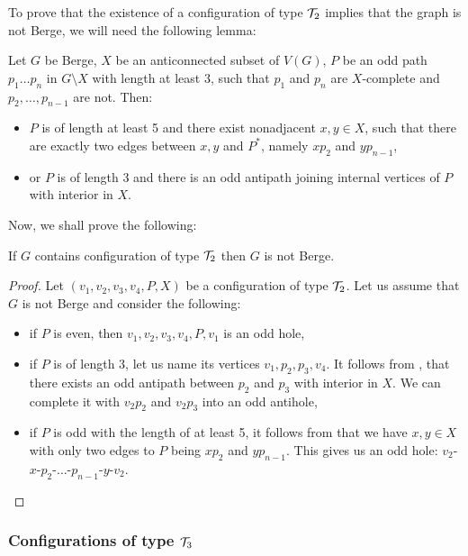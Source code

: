 To prove that the existence of a configuration of type $\mathcal{T}_2$ implies that the graph is not Berge, we will need the following lemma:

\begin{lemma}\label{lem:Roussel-Rubio}
	Let $G$ be Berge, $X$ be an anticonnected subset of $V(G)$, $P$ be an odd path $p_1\ldots p_n$ in $G\setminus X$ with length at least 3, such that $p_1$ and $p_n$ are $X$-complete and $p_2, \ldots, p_{n-1}$ are not. Then:
	\begin{itemize}
		\item $P$ is of length at least 5 and there exist nonadjacent $x, y \in X$, such that there are exactly two edges between $x, y$ and $P^*$, namely $xp_2$ and $yp_{n-1}$,
		\item or $P$ is of length 3 and there is an odd antipath joining internal vertices of $P$ with interior in $X$.
	\end{itemize}
\end{lemma}

Now, we shall prove the following:

\begin{theorem}
	If $G$ contains configuration of type $\mathcal{T}_2$ then $G$ is not Berge.
\end{theorem}
\begin{proof}
	Let $(v_1, v_2, v_3, v_4, P, X)$ be a configuration of type $\mathcal{T}_2$. Let us assume that $G$ is not Berge and consider the following:
	\begin{itemize}
		\item if $P$ is even, then $v_1, v_2, v_3, v_4, P, v_1$ is an odd hole,
		\item if $P$ is of length 3, let us name its vertices $v_1, p_2, p_3, v_4$. It follows from , that there exists an odd antipath between $p_2$ and $p_3$ with interior in $X$. We can complete it with $v_2p_2$ and $v_2p_3$ into an odd antihole,
		\item if $P$ is odd with the length of at least 5, it follows from  that we have $x, y \in X$ with only two edges to $P$ being $xp_2$ and $yp_{n-1}$. This gives us an odd hole: $v_2$-$x$-$p_2$-$\ldots$-$p_{n-1}$-$y$-$v_2$.
	\end{itemize}
\end{proof}

\subsubsection{Configurations of type $\mathcal{T}_3$}

